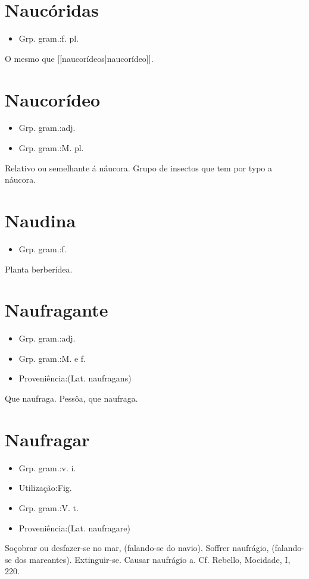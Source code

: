 \section{Naucóridas}
\begin{itemize}
\item {Grp. gram.:f. pl.}
\end{itemize}
O mesmo que [[naucorídeos|naucorídeo]].
\section{Naucorídeo}
\begin{itemize}
\item {Grp. gram.:adj.}
\end{itemize}
\begin{itemize}
\item {Grp. gram.:M. pl.}
\end{itemize}
Relativo ou semelhante á náucora.
Grupo de insectos que tem por typo a náucora.
\section{Naudina}
\begin{itemize}
\item {Grp. gram.:f.}
\end{itemize}
Planta berberídea.
\section{Naufragante}
\begin{itemize}
\item {Grp. gram.:adj.}
\end{itemize}
\begin{itemize}
\item {Grp. gram.:M.  e  f.}
\end{itemize}
\begin{itemize}
\item {Proveniência:(Lat. \textunderscore naufragans\textunderscore )}
\end{itemize}
Que naufraga.
Pessôa, que naufraga.
\section{Naufragar}
\begin{itemize}
\item {Grp. gram.:v. i.}
\end{itemize}
\begin{itemize}
\item {Utilização:Fig.}
\end{itemize}
\begin{itemize}
\item {Grp. gram.:V. t.}
\end{itemize}
\begin{itemize}
\item {Proveniência:(Lat. \textunderscore naufragare\textunderscore )}
\end{itemize}
Soçobrar ou desfazer-se no mar, (falando-se do navio).
Soffrer naufrágio, (falando-se dos mareantes).
Extinguir-se.
Causar naufrágio a. Cf. Rebello, \textunderscore Mocidade\textunderscore , I, 220.
